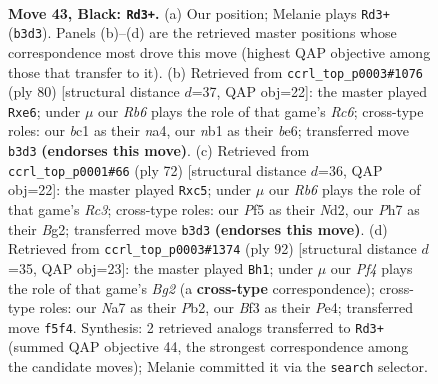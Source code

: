 \documentclass[11pt]{article}
\begin{document}
\clearpage

\begin{figure}[p]\centering
\begin{subfigure}{0.46\textwidth}\centering
\resizebox{\linewidth}{!}{%
\newchessgame
\chessboard[
  setfen={7k/n1PK1p1p/p7/P4p2/4p3/1r3bP1/8/RNB5 b - - 0 43},
  showmover=false,
  pgfstyle=straightmove, color=movearrow, markmove={b3-d3}
]}
\caption{}
\end{subfigure}\hfill
\begin{subfigure}{0.46\textwidth}\centering
\resizebox{\linewidth}{!}{%
\newchessgame
\chessboard[
  setfen={3r3k/6pp/B1R1b3/8/n3p3/3pP3/3P2PP/6K1 w - - 0 41},
  showmover=false,
  pgfstyle=straightmove, color=movearrow, markmove={c6-e6}
]}
\caption{}
\end{subfigure}
\\[4pt]
\begin{subfigure}{0.46\textwidth}\centering
\resizebox{\linewidth}{!}{%
\newchessgame
\chessboard[
  setfen={r4k2/5p1p/3n2p1/2nP4/5P2/2R3PP/3Nb1B1/6K1 w - - 0 37},
  showmover=false,
  pgfstyle=straightmove, color=movearrow, markmove={c3-c5}
]}
\caption{}
\end{subfigure}\hfill
\begin{subfigure}{0.46\textwidth}\centering
\resizebox{\linewidth}{!}{%
\newchessgame
\chessboard[
  setfen={1k1b2r1/pp1b4/8/3N4/3PPR1n/P5p1/1P4B1/1K6 w - - 1 47},
  showmover=false,
  pgfstyle=straightmove, color=movearrow, markmove={g2-h1}
]}
\caption{}
\end{subfigure}
\caption{\textbf{Move 43, Black: \texttt{Rd3+}.} (a) Our position; Melanie plays \texttt{Rd3+} (\texttt{b3d3}). Panels (b)--(d) are the retrieved master positions whose correspondence most drove this move (highest QAP objective among those that transfer to it). (b) Retrieved from \texttt{ccrl\_top\_p0003\#1076} (ply 80) [structural distance $d$=37, QAP obj=22]: the master played \texttt{Rxe6}; under $\mu$ our \emph{Rb6} plays the role of that game's \emph{Rc6}; cross-type roles: our \emph{b}c1 as their \emph{n}a4, our \emph{n}b1 as their \emph{b}e6; transferred move \texttt{b3d3} \textbf{(endorses this move)}. (c) Retrieved from \texttt{ccrl\_top\_p0001\#66} (ply 72) [structural distance $d$=36, QAP obj=22]: the master played \texttt{Rxc5}; under $\mu$ our \emph{Rb6} plays the role of that game's \emph{Rc3}; cross-type roles: our \emph{P}f5 as their \emph{N}d2, our \emph{P}h7 as their \emph{B}g2; transferred move \texttt{b3d3} \textbf{(endorses this move)}. (d) Retrieved from \texttt{ccrl\_top\_p0003\#1374} (ply 92) [structural distance $d$=35, QAP obj=23]: the master played \texttt{Bh1}; under $\mu$ our \emph{Pf4} plays the role of that game's \emph{Bg2} (a \textbf{cross-type} correspondence); cross-type roles: our \emph{N}a7 as their \emph{P}b2, our \emph{B}f3 as their \emph{P}e4; transferred move \texttt{f5f4}. Synthesis: 2 retrieved analogs transferred to \texttt{Rd3+} (summed QAP objective 44, the strongest correspondence among the candidate moves); Melanie committed it via the \texttt{search} selector.}
\label{fig:thought-m85}
\end{figure}
\end{document}
